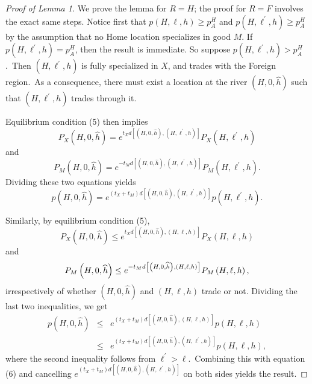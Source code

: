 \documentclass[12pt]{article}
\begin{document}
\begin{proof}[Proof of Lemma 1]
We prove the lemma for $R=H$; the proof for $R=F$ involves the exact same
steps. Notice first that $p\left( H,\ell ,h\right) \geq p_{A}^{H}$ and $%
p\left( H,\ell ^{\prime },h\right) \geq p_{A}^{H}$ by the assumption that no
Home location specializes in good $M$. If $p\left( H,\ell ^{\prime
},h\right) =p_{A}^{H}$, then the result is immediate. So suppose $p\left(
H,\ell ^{\prime },h\right) >p_{A}^{H}$.\ Then $\left( H,\ell ^{\prime
},h\right) $ is fully specialized in $X$, and trades with the Foreign
region.\ As a consequence, there must exist a location at the river $\left(
H,0,\widehat{h}\right) $ such that $\left( H,\ell ^{\prime },h\right) $
trades through it.

Equilibrium condition (5) then implies%
\begin{equation*}
P_{X}\left( H,0,\widehat{h}\right) =e^{t_{X}d\left[ \left( H,0,\widehat{h}%
\right) ,\left( H,\ell ^{\prime },h\right) \right] }P_{X}\left( H,\ell
^{\prime },h\right) 
\end{equation*}%
and%
\begin{equation*}
P_{M}\left( H,0,\widehat{h}\right) =e^{-t_{M}d\left[ \left( H,0,\widehat{h}%
\right) ,\left( H,\ell ^{\prime },h\right) \right] }P_{M}\left( H,\ell
^{\prime },h\right) .
\end{equation*}%
Dividing these two equations yields%
\begin{equation}
p\left( H,0,\widehat{h}\right) =e^{\left( t_{X}+t_{M}\right) d\left[ \left(
H,0,\widehat{h}\right) ,\left( H,\ell ^{\prime },h\right) \right] }p\left(
H,\ell ^{\prime },h\right) .
\end{equation}

Similarly, by equilibrium condition (5),%
\begin{equation*}
P_{X}\left( H,0,\widehat{h}\right) \leq e^{t_{X}d\left[ \left( H,0,\widehat{h%
}\right) ,\left( H,\ell ,h\right) \right] }P_{X}\left( H,\ell ,h\right) 
\end{equation*}%
and%
\begin{equation*}
P_{M}\left( H,0,\widehat{h}\right) \leq e^{-t_{M}d\left[ \left( H,0,\widehat{%
h}\right) ,\left( H,\ell ,h\right) \right] }P_{M}\left( H,\ell ,h\right) ,
\end{equation*}%
irrespectively of whether $\left( H,0,\widehat{h}\right) $ and $\left(
H,\ell ,h\right) $ trade or not. Dividing the last two inequalities, we get%
\begin{eqnarray*}
p\left( H,0,\widehat{h}\right)  &\leq &e^{\left( t_{X}+t_{M}\right) d\left[
\left( H,0,\widehat{h}\right) ,\left( H,\ell ,h\right) \right] }p\left(
H,\ell ,h\right)  \\
&\leq &e^{\left( t_{X}+t_{M}\right) d\left[ \left( H,0,\widehat{h}\right)
,\left( H,\ell ^{\prime },h\right) \right] }p\left( H,\ell ,h\right) ,
\end{eqnarray*}%
where the second inequality follows from $\ell ^{\prime }>\ell $.\ Combining
this with equation (6) and cancelling $e^{\left( t_{X}+t_{M}\right) d\left[
\left( H,0,\widehat{h}\right) ,\left( H,\ell ^{\prime },h\right) \right] }$
on both sides yields the result.
\end{proof}
\end{document}
